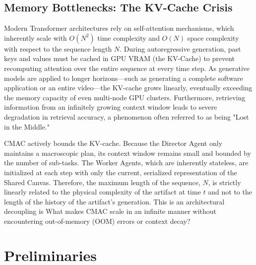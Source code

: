 \documentclass[pdflatex,sn-mathphys-num]{sn-jnl}
\begin{document}
\subsection{Memory Bottlenecks: The KV-Cache Crisis}
Modern Transformer architectures rely on self-attention mechanisms, which inherently scale with $O(N^2)$ time complexity and $O(N)$ space complexity with respect to the sequence length $N$. During autoregressive generation, past keys and values must be cached in GPU VRAM (the KV-Cache) to prevent recomputing attention over the entire sequence at every time step. 
As generative models are applied to longer horizons—such as generating a complete software application or an entire video—the KV-cache grows linearly, eventually exceeding the memory capacity of even multi-node GPU clusters. Furthermore, retrieving information from an infinitely growing context window leads to severe degradation in retrieval accuracy, a phenomenon often referred to as being "Lost in the Middle."

CMAC actively bounds the KV-cache. Because the Director Agent only maintains a macroscopic plan, its context window remains small and bounded by the number of sub-tasks. The Worker Agents, which are inherently stateless, are initialized at each step with only the current, serialized representation of the Shared Canvas. Therefore, the maximum length of the sequence, $N$, is strictly linearly related to the physical complexity of the artifact at time $t$ and not to the length of the history of the artifact's generation. This is an architectural decoupling is What makes CMAC scale in an infinite manner without encountering out-of-memory (OOM) errors or context decay?

\section{Preliminaries}
\end{document}
